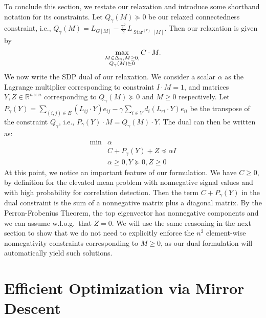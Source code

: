 \documentclass{article}
\DeclareMathOperator{\Star}{Star}
\begin{document}
To conclude this section, we restate our relaxation and introduce some shorthand notation for its constraints. Let $Q_{\gamma}(M) \succeq 0$ be our relaxed connectedness constraint, i.e., $Q_{\gamma}(M) = L_{G[M]} - \frac{\gamma^2}{2} \,  L_{\Star^{(r)}[M]}$.
%
Then our relaxation is given by
\begin{equation}\label{eq:primal_final}
  \max_{
  \begin{subarray}{c}
  M \in \Delta_n, M \geq 0,\\ Q_\gamma(M) \succeq 0
  \end{subarray}
  }
  C \cdot M.
\end{equation}
We now write the SDP dual of our relaxation. We consider a scalar $\alpha$ as the Lagrange multiplier corresponding to constraint $I \cdot M = 1$, and matrices $Y, Z \in \mathbb{R}^{n \times n}$ corresponding to $Q_\gamma(M) \succeq 0$ and $M \geq 0$ respectively. Let $P_\gamma(Y) = \sum_{(i,j) \in E} (L_{ij} \cdot Y ) e_{ij} - \gamma \sum_{i \in V} d_i (L_{ri} \cdot Y) e_{ii} $ be the transpose of the constraint $Q_\gamma$, i.e., $P_\gamma(Y) \cdot M = Q_\gamma(M) \cdot Y$.
The dual can then be written as:
\begin{eqnarray*}
\min & \alpha\\
&C + P_\gamma(Y) + Z \preceq  \alpha I\\
&{\alpha \geq 0, Y \succeq 0, Z \geq 0}
\end{eqnarray*}
At this point, we notice an important feature of our formulation. We have $C \geq 0$, by definition for the elevated mean problem with nonnegative signal values and with high probability for correlation detection. Then the term $C + P_\gamma(Y)$ in the dual constraint is the sum of a nonnegative matrix plus a diagonal matrix. By the Perron-Frobenius Theorem, the top eigenvector has nonnegative components and we can assume w.l.o.g.\ that $Z = 0$.
We will use the same reasoning in the next section to show that we do not need to explicitly enforce the $n^2$ element-wise nonnegativity constraints corresponding to $M \geq 0$, as our dual formulation will automatically yield such solutions. 


\section{Efficient Optimization via Mirror Descent}
\label{sec:MD}
\end{document}
